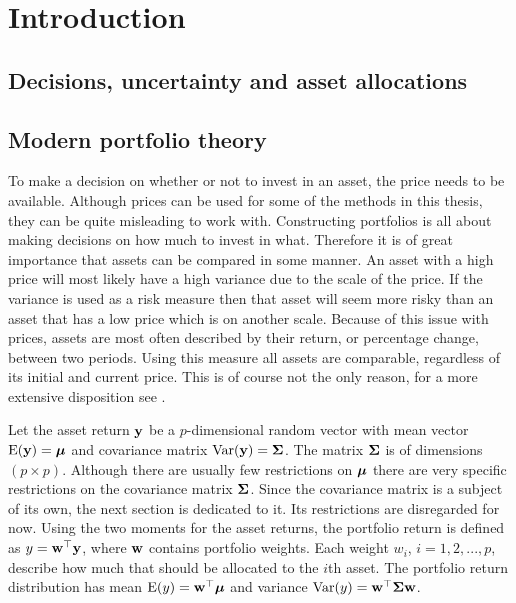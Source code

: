 \documentclass[12pt, oneside]{book}\usepackage{knitr}
\begin{document}
\newpage

\tableofcontents
\mainmatterSU

\part{Introduction}
\chapter{Decisions, uncertainty and asset allocations}\label{ch:intro}

\chapter{Modern portfolio theory}\label{ch:MPT}


To make a decision on whether or not to invest in an asset, the price needs to be available.
Although prices can be used for some of the methods in this thesis, they can be quite misleading to work with.
Constructing portfolios is all about making decisions on how much to invest in what.
Therefore it is of great importance that assets can be compared in some manner. 
An asset with a high price will most likely have a high variance due to the scale of the price. 
If the variance is used as a risk measure then that asset will seem more risky than an asset that has a low price which is on another scale.
Because of this issue with prices, assets are most often described by their return, or percentage change, between two periods. 
Using this measure all assets are comparable, regardless of its initial and current price.
This is of course not the only reason, for a more extensive disposition see \citet[ch. 1]{tsay2005analysis}.

Let the asset return $\mathbf{y}$ be a $p$-dimensional random vector with mean vector $\operatorname{E}(\mathbf{y})=\mbox{\boldmath$\mu$}$ and covariance matrix $\operatorname{Var}(\mathbf{y})=\mathbf{\Sigma}$. 
The matrix $\mathbf{\Sigma}$ is of dimensions $(p \times p)$. 
Although there are usually few restrictions on $\mbox{\boldmath$\mu$}$ there are very specific restrictions on the covariance matrix $\mathbf{\Sigma}$. 
Since the covariance matrix is a subject of its own, the next section is dedicated to it.
Its restrictions are disregarded for now.
Using the two moments for the asset returns, the portfolio return is defined as $y = \mathbf{w}^\top \mathbf{y}$, where $\mathbf{w}$ contains portfolio weights.
Each weight $w_i$, $i=1,2,...,p$, describe how much that should be allocated to the $i$th asset.
The portfolio return distribution has mean $\operatorname{E}(y)=\mathbf{w}^\top \mbox{\boldmath$\mu$}$ and variance $\operatorname{Var}(y)=\mathbf{w}^\top \mathbf{\Sigma} \mathbf{w}$. 
\end{document}
